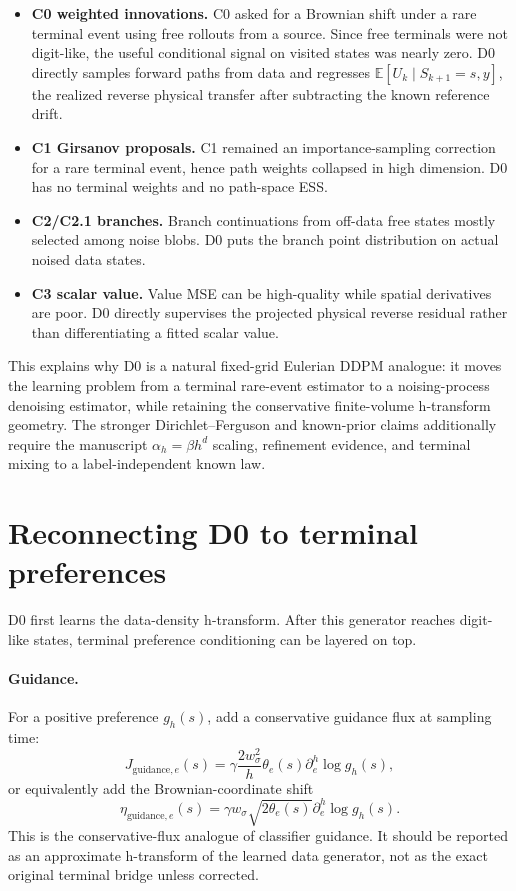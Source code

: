 \documentclass[11pt]{article}
\numberwithin{equation}{section}
\newcommand{\E}{\mathbb E}
\newcommand{\1}{\mathbf 1}
\begin{document}
\begin{itemize}[leftmargin=1.5em]
  \item \textbf{C0 weighted innovations.}  C0 asked for a Brownian shift under a rare terminal event using free rollouts from a source.  Since free terminals were not digit-like, the useful conditional signal on visited states was nearly zero.  D0 directly samples forward paths from data and regresses \(\E[U_k\mid S_{k+1}=s,y]\), the realized reverse physical transfer after subtracting the known reference drift.
  \item \textbf{C1 Girsanov proposals.}  C1 remained an importance-sampling correction for a rare terminal event, hence path weights collapsed in high dimension.  D0 has no terminal weights and no path-space ESS.
  \item \textbf{C2/C2.1 branches.}  Branch continuations from off-data free states mostly selected among noise blobs.  D0 puts the branch point distribution on actual noised data states.
  \item \textbf{C3 scalar value.}  Value MSE can be high-quality while spatial derivatives are poor.  D0 directly supervises the projected physical reverse residual rather than differentiating a fitted scalar value.
\end{itemize}

This explains why D0 is a natural fixed-grid Eulerian DDPM analogue: it moves the learning problem from a terminal rare-event estimator to a noising-process denoising estimator, while retaining the conservative finite-volume h-transform geometry.  The stronger Dirichlet--Ferguson and known-prior claims additionally require the manuscript \(\alpha_h=\beta h^d\) scaling, refinement evidence, and terminal mixing to a label-independent known law.

\section{Reconnecting D0 to terminal preferences}

D0 first learns the data-density h-transform.  After this generator reaches digit-like states, terminal preference conditioning can be layered on top.

\paragraph{Guidance.}
For a positive preference \(g_h(s)\), add a conservative guidance flux at sampling time:
\begin{equation}\label{eq:d0-guidance-flux}
  J_{\mathrm{guidance},e}(s)=\gamma\frac{2w_\sigma^2}{h}\theta_e(s)\partial_e^h\log g_h(s),
\end{equation}
or equivalently add the Brownian-coordinate shift
\begin{equation}\label{eq:d0-guidance-brownian}
  \eta_{\mathrm{guidance},e}(s)=\gamma w_\sigma\sqrt{2\theta_e(s)}\partial_e^h\log g_h(s).
\end{equation}
This is the conservative-flux analogue of classifier guidance.  It should be reported as an approximate h-transform of the learned data generator, not as the exact original terminal bridge unless corrected.
\end{document}
